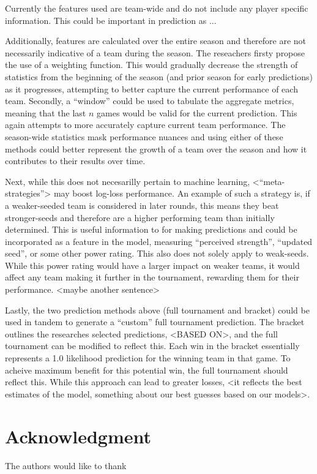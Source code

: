 \documentclass[conference]{IEEEtran}
\begin{document}
Currently the features used are team-wide and do not include any player specific information. This could be important in prediction as ...

Additionally, features are calculated over the entire season and therefore are not necessarily indicative of a team during the season. The reseachers firsty propose the use of a weighting function. This would gradually decrease the strength of statistics from the beginning of the season (and prior season for early predictions) as it progresses, attempting to better capture the current performance of each team. Secondly, a ``window'' could be used to tabulate the aggregate metrics, meaning that the last $n$ games would be valid for the current prediction. This again attempts to more accurately capture current team performance. The season-wide statistics mask performance nuances and using either of these methods could better represent the growth of a team over the season and how it contributes to their results over time.

Next, while this does not necesarilly pertain to machine learning, <``meta-strategies''> may boost log-loss performance. An example of such a strategy is, if a weaker-seeded team is considered in later rounds, this means they beat stronger-seeds and therefore are a higher performing team than initially determined. This is useful information to for making predictions and could be incorporated as a feature in the model, measuring ``perceived strength'', ``updated seed'', or some other power rating. This also does not solely apply to weak-seeds. While this power rating would have a larger impact on weaker teams, it would affect any team making it further in the tournament, rewarding them for their performance. <maybe another sentence>

Lastly, the two prediction methods above (full tournament and bracket) could be used in tandem to generate a ``custom'' full tournament prediction. The bracket outlines the researches selected predictions, <BASED ON>, and the full tournament can be modified to reflect this. Each win in the bracket essentially represents a 1.0 likelihood prediction for the winning team in that game. To acheive maximum benefit for this potential win, the full tournament should reflect this. While this approach can lead to greater losses, <it reflects the best estimates of the model, something about our best guesses based on our models>.

\section*{Acknowledgment}
The authors would like to thank
\end{document}
